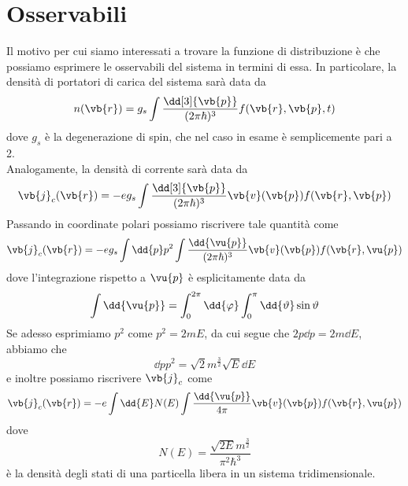 \section{Osservabili}
Il motivo per cui siamo interessati a trovare la funzione di distribuzione è che possiamo esprimere le osservabili del sistema in termini di essa. In particolare, la densità di portatori di carica del sistema sarà data da
\begin{equation*}
    n(\vb{r})
    =g_s \int \frac{\dd[3]{\vb{p}}}{(2 \pi \hbar)^3} f(\vb{r},\vb{p},t)
\end{equation*}
dove $g_s$ è la degenerazione di spin, che nel caso in esame è semplicemente pari a 2.\\
Analogamente, la densità di corrente sarà data da
\begin{equation*}
    \vb{j}_c(\vb{r})
    =-e g_s \int \frac{\dd[3]{\vb{p}}}{(2 \pi \hbar)^3} \vb{v}(\vb{p}) f(\vb{r},\vb{p})
\end{equation*}
Passando in coordinate polari possiamo riscrivere tale quantità come
\begin{equation*}
    \vb{j}_c(\vb{r})
    =-e g_s \int \dd{p} p^2 \int \frac{\dd{\vu{p}}}{(2\pi\hbar)^3} \vb{v}(\vb{p}) f(\vb{r},\vu{p})
\end{equation*}
dove l'integrazione rispetto a $\vu{p}$ è esplicitamente data da
\begin{equation*}
    \int \dd{\vu{p}}
    =\int_{0}^{2\pi} \dd{\varphi} \int_{0}^{\pi} \dd{\vartheta} \sin{\vartheta}
\end{equation*}
Se adesso esprimiamo $p^2$ come $p^2=2mE$, da cui segue che $2p \dd{p}=2m \dd{E}$, abbiamo che
\begin{equation*}
    \dd{p} p^2
    =\sqrt{2} m^{\frac{3}{2}} \sqrt{E} \dd{E}
\end{equation*}
e inoltre possiamo riscrivere $\vb{j}_c$ come
\begin{equation*}
    \vb{j}_c(\vb{r})
    =-e \int \dd{E} N(E) \int \frac{\dd{\vu{p}}}{4\pi} \vb{v}(\vb{p}) f(\vb{r},\vu{p})
\end{equation*}
dove
\begin{equation*}
    N(E)
    =\frac{\sqrt{2E} m^{\frac{3}{2}}}{\pi^2 \hbar^3}
\end{equation*}
è la densità degli stati di una particella libera in un sistema tridimensionale.\\

